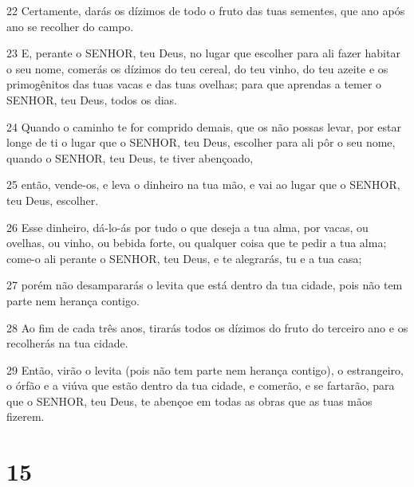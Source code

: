 \par 22 Certamente, darás os dízimos de todo o fruto das tuas sementes, que ano após ano se recolher do campo.
\par 23 E, perante o SENHOR, teu Deus, no lugar que escolher para ali fazer habitar o seu nome, comerás os dízimos do teu cereal, do teu vinho, do teu azeite e os primogênitos das tuas vacas e das tuas ovelhas; para que aprendas a temer o SENHOR, teu Deus, todos os dias.
\par 24 Quando o caminho te for comprido demais, que os não possas levar, por estar longe de ti o lugar que o SENHOR, teu Deus, escolher para ali pôr o seu nome, quando o SENHOR, teu Deus, te tiver abençoado,
\par 25 então, vende-os, e leva o dinheiro na tua mão, e vai ao lugar que o SENHOR, teu Deus, escolher.
\par 26 Esse dinheiro, dá-lo-ás por tudo o que deseja a tua alma, por vacas, ou ovelhas, ou vinho, ou bebida forte, ou qualquer coisa que te pedir a tua alma; come-o ali perante o SENHOR, teu Deus, e te alegrarás, tu e a tua casa;
\par 27 porém não desampararás o levita que está dentro da tua cidade, pois não tem parte nem herança contigo.
\par 28 Ao fim de cada três anos, tirarás todos os dízimos do fruto do terceiro ano e os recolherás na tua cidade.
\par 29 Então, virão o levita (pois não tem parte nem herança contigo), o estrangeiro, o órfão e a viúva que estão dentro da tua cidade, e comerão, e se fartarão, para que o SENHOR, teu Deus, te abençoe em todas as obras que as tuas mãos fizerem.

\chapter{15}

